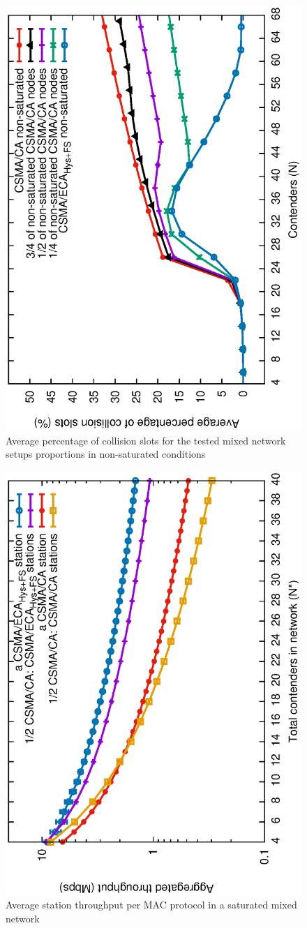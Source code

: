 	\begin{figure}[tb]
		\centering
		\includegraphics[width=0.7\linewidth,angle=-90]{figures/unsaturated/mixed/collisions-mixed/collisions-mixed-unsaturated-TON.eps}
		\caption{Average percentage of collision slots for the tested mixed network setups proportions in non-saturated conditions}
		\label{fig:mixCollisions-unsat}
	\end{figure}
	
	\begin{figure}[tb]
		\centering
		\includegraphics[width=0.7\linewidth,angle=-90]{figures/saturated/mixed/throughput-per-protocol/throughput-per-protocol-TON.eps}
		\caption{Average station throughput per MAC protocol in a saturated mixed network}
		\label{fig:mixThroughput-sat-perProtocol-TON}
	\end{figure}
	
